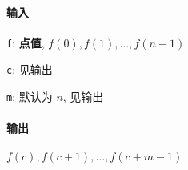 \paragraph{输入}

\verb|f|: \textbf{点值}, \(f(0), f(1), \dots, f(n-1)\)

\verb|c|: 见输出

\verb|m|: 默认为 \(n\), 见输出

\paragraph{输出}

\(f(c), f(c+1), \dots, f(c+m-1)\)
